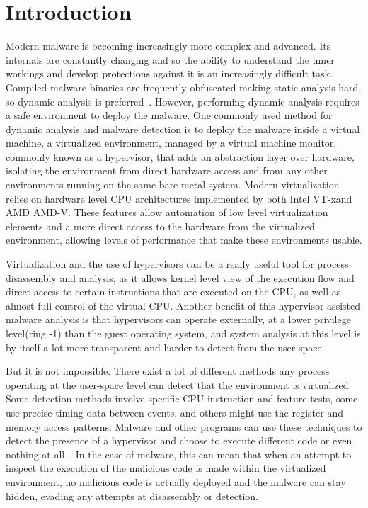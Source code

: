 \section{Introduction}\label{s:intro}

Modern malware is becoming increasingly more complex and advanced.
Its internals are constantly changing and so the ability to understand the inner workings and develop protections against it is an increasingly difficult task. 
Compiled malware binaries are frequently obfuscated making static analysis hard, so dynamic analysis is preferred~\cite{Leon2021, 10.1145/2245276.2232070}. However, performing dynamic analysis requires a safe environment 
to deploy the malware. One commonly used method for dynamic analysis and malware detection is to deploy the malware inside a virtual machine, a virtualized environment, managed by a virtual machine monitor, 
commonly known as a hypervisor, that adds an abstraction layer over hardware, isolating the environment from direct hardware access and from any other environments running on the same bare metal system. 
Modern virtualization relies on hardware level CPU architectures implemented by both Intel\textsuperscript{\tiny\textregistered} VT-x\texttrademark and AMD\textsuperscript{\tiny\textregistered} AMD-V\texttrademark. 
These features allow automation of low level virtualization elements and a more direct access to the hardware from the virtualized environment, allowing levels of performance that make these environments usable.

Virtualization and the use of hypervisors can be a really useful tool for process disassembly and analysis, as it allows kernel level view of the execution flow and direct access to certain instructions that are executed on the CPU, as well as almost full
control of the virtual CPU.
Another benefit of this hypervisor assisted malware analysis is that hypervisors can operate externally, at a lower privilege level(ring -1) than the guest operating system, 
and system analysis at this level is by itself a lot more transparent and harder to detect from the user-space.

But it is not impossible. There exist a lot of different methods any process operating at the user-space level can detect that the environment is virtualized. 
Some detection methods involve specific CPU instruction and feature tests, some use precise timing data between events, and others might use the register and memory access patterns. 
Malware and other programs can use these techniques to detect the presence of a hypervisor and choose to execute different code or even nothing at all~\cite{10.1109/TIFS.2020.2976559}. 
In the case of malware, this can mean that when an attempt to inspect the execution of the malicious code is made within the virtualized environment, 
no malicious code is actually deployed and the malware can stay hidden, evading any attempts at disassembly or detection.

